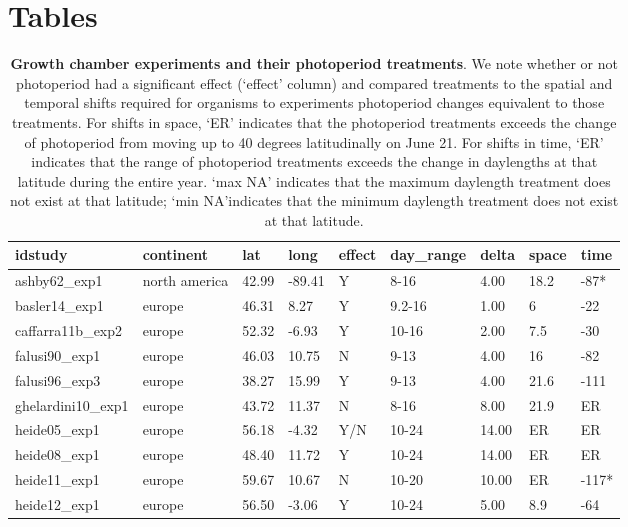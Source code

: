 \documentclass{article}
\begin{document}
\section* {Tables}
\begin{table}[ht]
\centering
\caption{\textbf{Growth chamber experiments and their photoperiod treatments}. We note whether or not photoperiod had a significant effect (`effect' column) and compared treatments to the spatial and temporal shifts required for organisms to experiments photoperiod changes equivalent to those treatments. For shifts in space, `ER' indicates that the photoperiod treatments exceeds the change of photoperiod from moving up to 40 degrees latitudinally on June 21. For shifts in time, `ER' indicates that the range of photoperiod treatments exceeds the change in daylengths at that latitude during the entire year. `max NA' indicates that the maximum daylength treatment does not exist at that latitude; `min NA'indicates that the minimum daylength treatment does not exist at that latitude.} 
\label{table:phototreats}
\begin{tabular}{|p{}|p{}|p{}|p{}|p{}|p{}|p{}|p{}|p{}|}
  \hline
idstudy & continent & lat & long & effect & day\_range & delta & space & time \\ 
  \hline
ashby62\_exp1 & north america & 42.99 & -89.41 & Y & 8-16 & 4.00 & 18.2 & -87* \\ 
  basler14\_exp1 & europe & 46.31 & 8.27 & Y & 9.2-16 & 1.00 & 6 & -22 \\ 
  caffarra11b\_exp2 & europe & 52.32 & -6.93 & Y & 10-16 & 2.00 & 7.5 & -30 \\ 
  falusi90\_exp1 & europe & 46.03 & 10.75 & N & 9-13 & 4.00 & 16 & -82 \\ 
  falusi96\_exp3 & europe & 38.27 & 15.99 & Y & 9-13 & 4.00 & 21.6 & -111 \\ 
  ghelardini10\_exp1 & europe & 43.72 & 11.37 & N & 8-16 & 8.00 & 21.9 & ER \\ 
  heide05\_exp1 & europe & 56.18 & -4.32 & Y/N & 10-24 & 14.00 & ER & ER \\ 
  heide08\_exp1 & europe & 48.40 & 11.72 & Y & 10-24 & 14.00 & ER & ER \\ 
  heide11\_exp1 & europe & 59.67 & 10.67 & N & 10-20 & 10.00 & ER & -117* \\ 
  heide12\_exp1 & europe & 56.50 & -3.06 & Y & 10-24 & 5.00 & 8.9 & -64 \\ 

\end{tabular}
\end{table}
\end{document}
